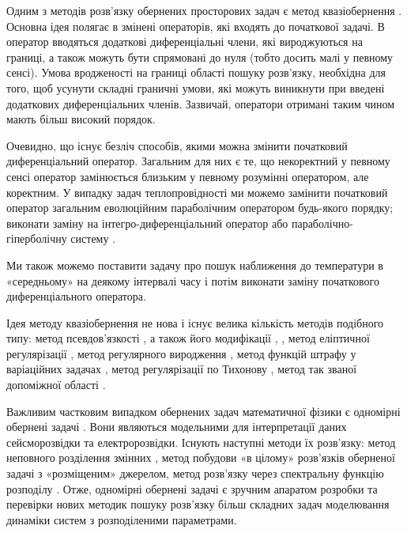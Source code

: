 Одним з методів розв’язку обернених просторових задач є метод квазіобернення \cite{Lattes-MetodKvazi, Lions-NekotoryeMedody, Lions-Upravlenie, Lions-Optimalnoe}.
Основна ідея полягає в
змінені операторів, які входять до початкової задачі. В оператор вводяться додаткові диференціальні члени, які
вироджуються на границі, а також можуть бути спрямовані до нуля (тобто досить малі у певному сенсі). Умова
вродженості на границі області пошуку розв’язку, необхідна для того, щоб усунути складні граничні умови, які можуть
виникнути при введені додаткових диференціальних членів. Зазвичай, оператори отримані таким чином мають більш високий
порядок.

Очевидно, що існує безліч способів, якими можна змінити початковий диференціальний оператор. Загальним для них є те,
що некоректний у певному сенсі оператор замінюється близьким у певному розумінні оператором, але коректним. У випадку
задач теплопровідності ми можемо замінити початковий оператор загальним еволюційним параболічним оператором будь-якого
порядку; виконати заміну на інтегро-диференціальний оператор або параболічно-гіперболічну систему \cite{Lavrentiev-Lineynye}.

Ми також можемо поставити задачу про пошук наближення до температури в «середньому» на деякому інтервалі часу і
потім виконати заміну початкового диференціального оператора.

Ідея методу квазіобернення не нова і існує велика кількість методів подібного типу: метод псевдов’язкості \cite{Neuman-AMethod}, а
також його модифікації \cite{Oleynik-Razryvye}, \cite{Lax-OnTheStability}, метод еліптичної регулярізації
\cite{Oleynik-ObOdnoy}, метод регулярного виродження \cite{Friedrichs-Asymptotic}, метод
функцій штрафу  у варіаційних задачах \cite{Courant-Variational}, метод регулярізації по Тихонову
\cite{Tihonov-Metody, Tihonov-Nekorrektnye, Tihonov-Reguliariziruiuschie, Tihonov-Matematicheskoe, Tihonov-Chislennye},
 метод так званої допоміжної області \cite{Sayliev-Oreshenii}.

Важливим частковим випадком обернених задач математичної фізики є одномірні обернені задачі \cite{Lavrentiev-Odnomermye}. Вони являються
модельними для інтерпретації даних сейсморозвідки та електророзвідки. Існують наступні методи їх розв’язку: метод
неповного розділення змінних \cite{Lavrentiev-Odnomermye}, метод побудови «в цілому» розв’язків оберненої задачі з «розміщеним» джерелом,
метод розв’язку через спектральну функцію розподілу \cite{Gelfand-ObOpredelenii, Lavrentiev-Odnomermye}.
Отже, одномірні обернені задачі є зручним апаратом
розробки та перевірки нових методик пошуку розв’язку більш складних задач моделювання динаміки систем з розподіленими
параметрами.

